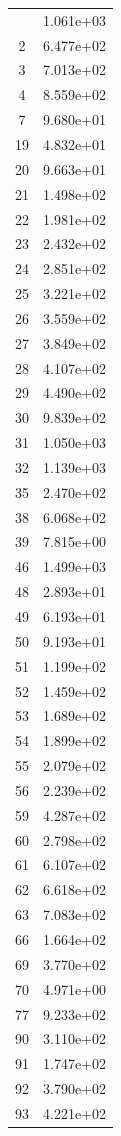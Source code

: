 \documentclass[12pt]{article}
\begin{document}
\begin{longtable}{@{}cc@{}}
\bottomrule
\endlastfoot
1 & 1.061e+03 \\
2 & 6.477e+02 \\
3 & 7.013e+02 \\
4 & 8.559e+02 \\
7 & 9.680e+01 \\
19 & 4.832e+01 \\
20 & 9.663e+01 \\
21 & 1.498e+02 \\
22 & 1.981e+02 \\
23 & 2.432e+02 \\
24 & 2.851e+02 \\
25 & 3.221e+02 \\
26 & 3.559e+02 \\
27 & 3.849e+02 \\
28 & 4.107e+02 \\
29 & 4.490e+02 \\
30 & 9.839e+02 \\
31 & 1.050e+03 \\
32 & 1.139e+03 \\
35 & 2.470e+02 \\
38 & 6.068e+02 \\
39 & 7.815e+00 \\
46 & 1.499e+03 \\
48 & 2.893e+01 \\
49 & 6.193e+01 \\
50 & 9.193e+01 \\
51 & 1.199e+02 \\
52 & 1.459e+02 \\
53 & 1.689e+02 \\
54 & 1.899e+02 \\
55 & 2.079e+02 \\
56 & 2.239e+02 \\
59 & 4.287e+02 \\
60 & 2.798e+02 \\
61 & 6.107e+02 \\
62 & 6.618e+02 \\
63 & 7.083e+02 \\
66 & 1.664e+02 \\
69 & 3.770e+02 \\
70 & 4.971e+00 \\
77 & 9.233e+02 \\
90 & 3.110e+02 \\
91 & 1.747e+02 \\
92 & 3.790e+02 \\
93 & 4.221e+02 \\

\end{longtable}
\end{document}
